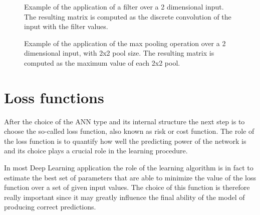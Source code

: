 \begin{figure}[h]
    \centering
      
    \caption{Example of the application of a filter over a 2 dimensional input. The resulting matrix is computed as the discrete convolution of the input with the filter values.}
    \label{fig:cnn_filter}
\end{figure}

\begin{figure}[h]
    \centering
     
    \caption{Example of the application of the max pooling operation over a 2 dimensional input, with 2x2 pool size. The resulting matrix is computed as the maximum value of each 2x2 pool.}
    \label{fig:cnn_pool}
\end{figure}


%  


\section{Loss functions} \label{lossfunction}

After the choice of the ANN type and its internal structure the next step is to choose the so-called loss function, also known as risk or cost function\cite{lossfunc}. The role of the loss function is to quantify how well the predicting power of the network is and its choice plays a crucial role in the learning procedure.

In most Deep Learning application the role of the learning algorithm is in fact to estimate the best set of parameters that are able to minimize the value of the loss function over a set of given input values. The choice of this function is therefore really important since it may greatly influence the final ability of the model of producing correct predictions.

